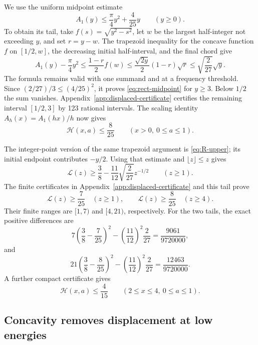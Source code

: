\documentclass[11pt,reqno]{amsart}
\numberwithin{equation}{section}
\begin{document}
We use the uniform midpoint estimate
\begin{equation}\label{eq:rect-midpoint}
 A_1(y)\le\frac\pi4y^2+\frac4{25}y\qquad(y\ge0).
\end{equation}
To obtain its tail, take $f(s)=\sqrt{y^2-s^2}$, let $w$ be
the largest half-integer not exceeding $y$, and set $r=y-w$.
The trapezoid inequality for the concave function $f$ on
$[1/2,w]$, the decreasing initial half-interval, and the final
chord give
\[
 A_1(y)-\frac\pi4y^2
 \le\frac{1-r}{2}f(w)
 \le\frac{\sqrt{2y}}2(1-r)\sqrt r
 \le\sqrt{\frac2{27}}\sqrt y.
\]
The formula remains valid with one summand and at a frequency
threshold. Since $(2/27)/3\le(4/25)^2$, it proves
\eqref{eq:rect-midpoint} for $y\ge3$. Below $1/2$ the sum
vanishes. Appendix~\ref{app:displaced-certificate} certifies the
remaining interval $[1/2,3]$ by 123 rational intervals.
The scaling identity $A_h(x)=A_1(hx)/h$ now gives
\begin{equation}\label{eq:rect-H-global}
 \mathcal H(x,a)\le\frac8{25}\qquad(x>0,\ 0\le a\le1).
\end{equation}

The integer-point version of the same trapezoid argument is
\eqref{eq:R-upper}; its initial endpoint contributes $-y/2$.
Using that estimate and $\lfloor z\rfloor\le z$ gives
\begin{equation}\label{eq:rect-L-tail}
 \mathcal L(z)\ge\frac38-\frac{11}{12}\sqrt{\frac2{27}}z^{-1/2}
 \qquad(z\ge1).
\end{equation}
The finite certificates in Appendix~\ref{app:displaced-certificate}
and this tail prove
\begin{equation}\label{eq:rect-L-bounds}
 \mathcal L(z)\ge\frac7{25}\quad(z\ge1),\qquad
 \mathcal L(z)\ge\frac8{25}\quad(z\ge4).
\end{equation}
Their finite ranges are $[1,7)$ and $[4,21)$, respectively.
For the two tails, the exact positive differences are
\[
 7\left(\frac38-\frac7{25}\right)^2
 -\left(\frac{11}{12}\right)^2\frac2{27}
 =\frac{9061}{9720000},
\]
and
\[
 21\left(\frac38-\frac8{25}\right)^2
 -\left(\frac{11}{12}\right)^2\frac2{27}
 =\frac{12463}{9720000}.
\]
A further compact certificate gives
\begin{equation}\label{eq:rect-H-middle}
 \mathcal H(x,a)\le\frac4{15}
 \qquad(2\le x\le4,\ 0\le a\le1).
\end{equation}

\subsection*{Concavity removes displacement at low energies}
\end{document}
